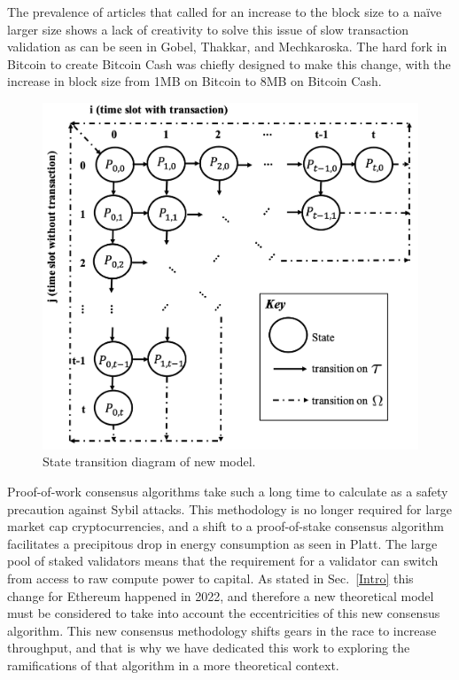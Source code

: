 \documentclass[conference]{IEEEtran}
\begin{document}
The prevalence of articles that called for an increase to the block size to a na\"ive larger size shows 
a lack of creativity to solve this issue of slow transaction validation as can be seen in Gobel, Thakkar, 
and Mechkaroska\cite{2017_IEEE_Gobel, 2018_IEEE_Thakkar, 2018_TELFOR_Mechkaroska}. The 
hard fork in Bitcoin to create Bitcoin Cash was chiefly designed to make this change, with the increase 
in block size from 1MB on Bitcoin to 8MB on Bitcoin Cash. 

\begin{figure}[htbp]
    \centerline{\includegraphics[width=\textwidth]{Figures/Flow}}
    \caption{State transition diagram of new model.} 
    \label{flow}
\end{figure}	

Proof-of-work consensus algorithms take such a long time to calculate as a safety precaution against
Sybil attacks. This methodology is no longer required for large market cap cryptocurrencies, and a 
shift to a proof-of-stake consensus algorithm facilitates a precipitous drop in energy consumption
as seen in Platt\cite{2021_IEEEQRSC_Platt}. The large pool of staked validators means that the 
requirement for a validator can switch from access to raw compute power to capital. As stated in 
Sec.~\ref{Intro} this change for Ethereum happened in 2022, and therefore a new theoretical model
must be considered to take into account the eccentricities of this new consensus algorithm. This 
new consensus methodology shifts gears in the race to increase throughput, and that is why we 
have dedicated this work to exploring the ramifications of that algorithm in a more theoretical context.
\end{document}
